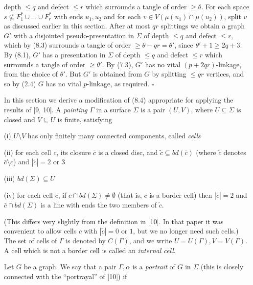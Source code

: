 \noindent depth $\le q$ and defect $\le r$ which surrounds a tangle of order $\ge \theta$. For each space $s \not\subseteq F_1^* \cup \dots \cup F_r^*$ with ends $u_1, u_2$ and for each $v \in V(\mu(u_1) \cap \mu(u_2))$, split $v$ as discussed earlier in this section. After at most $qr$ splittings we obtain a graph $G'$ with a disjointed pseudo-presentation in $\Sigma$ of depth $\le q$ and defect $\le r$, which by (8.3) surrounds a tangle of order $\ge \theta - qr = \theta'$, since $\theta' + 1 \ge 2q + 3$. By (8.1), $G'$ has a presentation in $\Sigma$ of depth $\le q$ and defect $\le r$ which surrounds a tangle of order $\ge \theta'$. By (7.3), $G'$ has no vital $(p + 2qr)$-linkage, from the choice of $\theta'$. But $G'$ is obtained from $G$ by splitting $\le qr$ vertices, and so by (2.4) $G$ has no vital $p$-linkage, as required. $\square$


In this section we derive a modification of (8.4) appropriate for applying the results of [9, 10]. A \textit{painting} $\Gamma$ in a surface $\Sigma$ is a pair $(U, V)$, where $U \subseteq \Sigma$ is closed and $V \subseteq U$ is finite, satisfying

\hspace*{12pt}(i) $U \setminus V$ has only finitely many connected components, called \textit{cells}

\hspace*{12pt}(ii) for each cell $c$, its closure $\bar{c}$ is a closed disc, and $\tilde{c} \subseteq bd(\bar{c})$ (where $\tilde{c}$ denotes $\bar{c} \setminus c$) and $|\tilde{c}| = 2$ or $3$

\hspace*{12pt}(iii) $bd(\Sigma) \subseteq U$

\hspace*{12pt}(iv) for each cell $c$, if $c \cap bd(\Sigma) \ne \emptyset$ (that is, $c$ is a border cell) then $|\tilde{c}| = 2$ and $\bar{c} \cap bd(\Sigma)$ is a line with ends the two members of $\tilde{c}$.

(This differs very slightly from the definition in [10]. In that paper it was convenient to allow cells $c$ with $|\tilde{c}| = 0$ or $1$, but we no longer need such cells.) The set of cells of $\Gamma$ is denoted by $C(\Gamma)$, and we write $U = U(\Gamma), V = V(\Gamma)$. A cell which is not a border cell is called an \textit{internal cell}.

Let $G$ be a graph. We say that a pair $\Gamma, \alpha$ is a \textit{portrait} of $G$ in $\Sigma$ (this is closely connected with the ``portrayal'' of [10]) if

